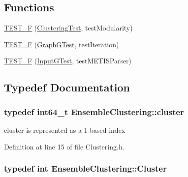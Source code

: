 \subsection*{Functions}
\begin{DoxyCompactItemize}
\item 
\hyperlink{namespace_ensemble_clustering_a21108087fb4225d2c718b2ab980a0352}{T\-E\-S\-T\-\_\-\-F} (\hyperlink{class_ensemble_clustering_1_1_clustering_test}{Clustering\-Test}, test\-Modularity)
\item 
\hyperlink{namespace_ensemble_clustering_ab112b02697a12bdbc3b4e866d60444d3}{T\-E\-S\-T\-\_\-\-F} (\hyperlink{class_ensemble_clustering_1_1_graph_g_test}{Graph\-G\-Test}, test\-Iteration)
\item 
\hyperlink{namespace_ensemble_clustering_a968aa929eb81f21fab68af5447226d50}{T\-E\-S\-T\-\_\-\-F} (\hyperlink{class_ensemble_clustering_1_1_input_g_test}{Input\-G\-Test}, test\-M\-E\-T\-I\-S\-Parser)
\end{DoxyCompactItemize}


\subsection{Typedef Documentation}
\hypertarget{namespace_ensemble_clustering_a5ae38234e207add524443be6e597b970}{
\subsubsection[{cluster}]{\setlength{\rightskip}{0pt plus 5cm}typedef int64\-\_\-t {\bf Ensemble\-Clustering\-::cluster}}}\label{namespace_ensemble_clustering_a5ae38234e207add524443be6e597b970}


cluster is represented as a 1-\/based index 



Definition at line 15 of file Clustering.\-h.

\hypertarget{namespace_ensemble_clustering_a8d9740fbc7cc7696652cd8b6974121ac}{
\subsubsection[{Cluster}]{\setlength{\rightskip}{0pt plus 5cm}typedef int {\bf Ensemble\-Clustering\-::\-Cluster}}}\label{namespace_ensemble_clustering_a8d9740fbc7cc7696652cd8b6974121ac}


